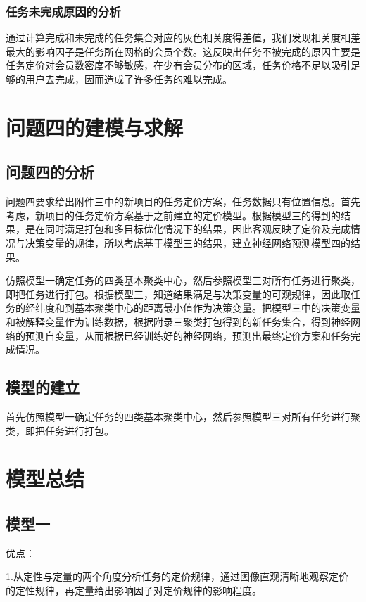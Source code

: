 \documentclass[withoutpreface,bwprint]{cumcmthesis} %
\begin{document}
\subsubsection{任务未完成原因的分析}
通过计算完成和未完成的任务集合对应的灰色相关度得差值，我们发现相关度相差最大的影响因子是任务所在网格的会员个数。这反映出任务不被完成的原因主要是任务定价对会员数密度不够敏感，在少有会员分布的区域，任务价格不足以吸引足够的用户去完成，因而造成了许多任务的难以完成。




\section{问题四的建模与求解}
\subsection{问题四的分析}
问题四要求给出附件三中的新项目的任务定价方案，任务数据只有位置信息。首先考虑，新项目的任务定价方案基于之前建立的定价模型。根据模型三的得到的结果，是在同时满足打包和多目标优化情况下的结果，因此客观反映了定价及完成情况与决策变量的规律，所以考虑基于模型三的结果，建立神经网络预测模型四的结果。

仿照模型一确定任务的四类基本聚类中心，然后参照模型三对所有任务进行聚类，即把任务进行打包。根据模型三，知道结果满足与决策变量的可观规律，因此取任务的经纬度和到基本聚类中心的距离最小值作为决策变量。把模型三中的决策变量和被解释变量作为训练数据，根据附录三聚类打包得到的新任务集合，得到神经网络的预测自变量，从而根据已经训练好的神经网络，预测出最终定价方案和任务完成情况。

\subsection{模型的建立}
首先仿照模型一确定任务的四类基本聚类中心，然后参照模型三对所有任务进行聚类，即把任务进行打包。


\section{模型总结}
\subsection{模型一}

优点：

1.从定性与定量的两个角度分析任务的定价规律，通过图像直观清晰地观察定价
的定性规律，再定量给出影响因子对定价规律的影响程度。
\end{document}
